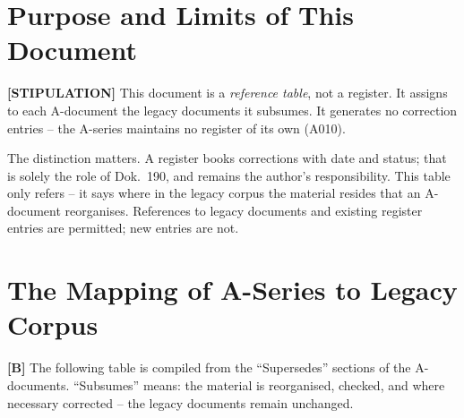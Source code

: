 \section{Purpose and Limits of This Document}

\textbf{[STIPULATION]} This document is a \emph{reference table}, not a register.
It assigns to each A-document the legacy documents it subsumes. It generates no
correction entries -- the A-series maintains no register of its own (A010).

The distinction matters. A register books corrections with date and status; that
is solely the role of Dok.~190, and remains the author's responsibility. This
table only refers -- it says where in the legacy corpus the material resides that
an A-document reorganises. References to legacy documents and existing register
entries are permitted; new entries are not.

\section{The Mapping of A-Series to Legacy Corpus}

\textbf{[B]} The following table is compiled from the ``Supersedes'' sections of
the A-documents. ``Subsumes'' means: the material is reorganised, checked, and
where necessary corrected -- the legacy documents remain unchanged.

